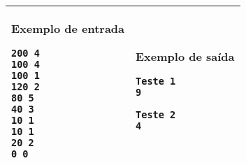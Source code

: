 \begin{table}[!ht]
\centering
\begin{tabular}{|l|l|}
\hline
\begin{minipage}[t]{3in}
\textbf{Exemplo de entrada}
\begin{verbatim}
200 4
100 4
100 1
120 2
80 5
40 3
10 1
10 1
20 2
0 0
\end{verbatim}
\vspace{1mm}
\end{minipage}
&

\begin{minipage}[t]{3in}
\textbf{Exemplo de saída}
\begin{verbatim}
Teste 1
9

Teste 2
4

\end{verbatim}
\vspace{1mm}
\end{minipage} \\
\hline
\end{tabular}
\end{table}

\newpage

\vspace*{\fill}

\newpage

